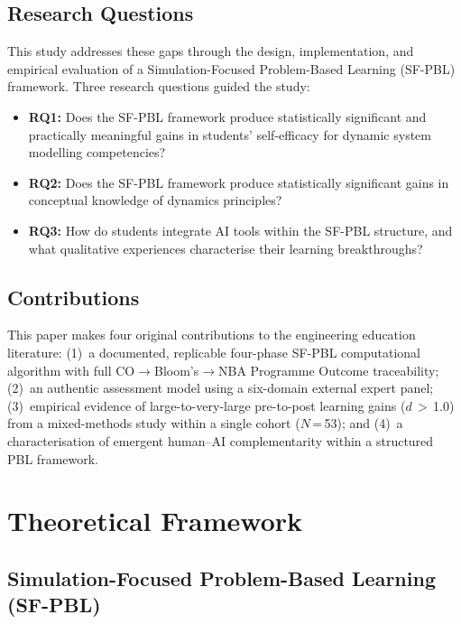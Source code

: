 \documentclass[utf8]{FrontiersinHarvard}
\begin{document}
\subsection{Research Questions}

This study addresses these gaps through the design, implementation, and
empirical evaluation of a Simulation-Focused Problem-Based Learning
(SF-PBL) framework. Three research questions guided the study:

\begin{itemize}\setlength{\itemsep}{0pt}\setlength{\parskip}{0pt}
  \item \textbf{RQ1:} Does the SF-PBL framework produce statistically
    significant and practically meaningful gains in students' self-efficacy
    for dynamic system modelling competencies?
  \item \textbf{RQ2:} Does the SF-PBL framework produce statistically
    significant gains in conceptual knowledge of dynamics principles?
  \item \textbf{RQ3:} How do students integrate AI tools within the
    SF-PBL structure, and what qualitative experiences characterise their
    learning breakthroughs?
\end{itemize}

\subsection{Contributions}

This paper makes four original contributions to the engineering education
literature: (1)~a documented, replicable four-phase SF-PBL computational
algorithm with full CO$\rightarrow$Bloom's$\rightarrow$NBA Programme
Outcome traceability; (2)~an authentic assessment model using a
six-domain external expert panel; (3)~empirical evidence of large-to-very-large
{\color{blue} pre-to-post learning gains ($d$\,$>$\,1.0) from a mixed-methods study
within a single cohort ($N$\,=\,53);} and (4)~a characterisation of emergent human--AI
complementarity within a structured PBL framework.

\section{Theoretical Framework}

\subsection{Simulation-Focused Problem-Based Learning (SF-PBL)}
\end{document}
